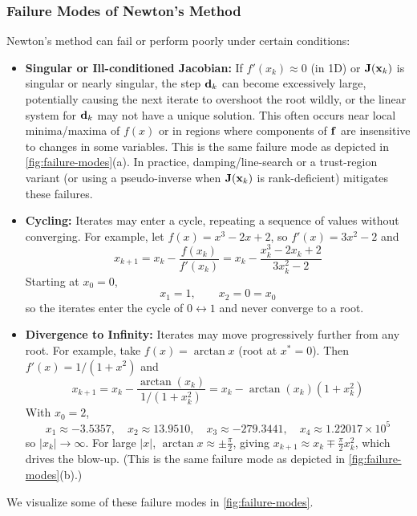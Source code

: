 \subsubsection{Failure Modes of Newton's Method}
Newton's method can fail or perform poorly under certain conditions:
\begin{itemize}
    \item \textbf{Singular or Ill-conditioned Jacobian:} If $f'(x_k) \approx 0$ (in 1D) or $\mathbf{J}(\mathbf{x}_k)$ is singular or nearly singular, the step $\mathbf{d}_k$ can become excessively large, potentially causing the next iterate to overshoot the root wildly, or the linear system for $\mathbf{d}_k$ may not have a unique solution. This often occurs near local minima/maxima of $f(x)$ or in regions where components of $\mathbf{f}$ are insensitive to changes in some variables. This is the same failure mode as depicted in \autoref{fig:failure-modes}(a). In practice, damping/line-search or a trust-region variant (or using a pseudo-inverse when $\mathbf{J}(\mathbf{x}_k)$ is rank-deficient) mitigates these failures.

    \item \textbf{Cycling:} Iterates may enter a cycle, repeating a sequence of values without converging. For example, let $f(x)=x^3-2x+2$, so $f'(x)=3x^2-2$ and
    \[
    x_{k+1} = x_k-\frac{f(x_k)}{f'(x_k)} = x_k-\frac{x_k^3-2x_k+2}{3x_k^2-2}
    \]
    Starting at $x_0=0$,
    \[
    x_1=1,\qquad x_2 = 0 = x_0
    \]
    so the iterates enter the cycle of $0 \leftrightarrow 1$ and never converge to a root.
    
    \item \textbf{Divergence to Infinity:} Iterates may move progressively further from any root. For example, take $f(x)=\arctan x$ (root at $x^*=0$). Then $f'(x)=1/(1+x^2)$ and
    \[
    x_{k+1} = x_k - \frac{\arctan(x_k)}{1/(1+x_k^2)} = x_k - \arctan(x_k)(1+x_k^2)
    \]
    With $x_0=2$,
    \[
    x_1\approx -3.5357,\quad x_2\approx 13.9510,\quad x_3\approx -279.3441,\quad x_4\approx 1.22017\times 10^{5}
    \]
    so $|x_k|\to\infty$. For large $|x|$, $\arctan x\approx \pm\frac{\pi}{2}$, giving $x_{k+1}\approx x_k\mp\frac{\pi}{2}x_k^2$, which drives the blow-up. (This is the same failure mode as depicted in \autoref{fig:failure-modes}(b).)
\end{itemize}
We visualize some of these failure modes in \autoref{fig:failure-modes}.

